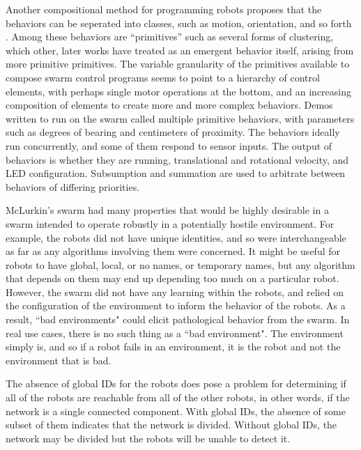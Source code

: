 \documentclass[]{article}
\begin{document}
Another compositional method for programming robots proposes that the behaviors can be seperated into classes, such as motion, orientation, and so forth \cite{mclurkin2004stupid}. 
Among these behaviors are ``primitives'' such as several forms of clustering, which other, later works have treated as an emergent behavior itself, arising from more primitive primitives. 
The variable granularity of the primitives available to compose swarm control programs seems to point to a hierarchy of control elements, with perhaps single motor operations at the bottom, and an increasing composition of elements to create more and more complex behaviors.
Demos written to run on the swarm called multiple primitive behaviors, with parameters such as degrees of bearing and centimeters of proximity. 
The behaviors ideally run concurrently, and some of them respond to sensor inputs. 
The output of behaviors is whether they are running, translational and rotational velocity, and LED configuration. 
Subsumption and summation are used to arbitrate between behaviors of differing priorities. 

McLurkin's swarm had many properties that would be highly desirable in a swarm intended to operate robustly in a potentially hostile environment. 
For example, the robots did not have unique identities, and so were interchangeable as far as any algorithms involving them were concerned. 
It might be useful for robots to have global, local, or no names, or temporary names, but any algorithm that depends on them may end up depending too much on a particular robot. 
However, the swarm did not have any learning within the robots, and relied on the configuration of the environment to inform the behavior of the robots. 
As a result, ``bad environments" could elicit pathological behavior from the swarm. 
In real use cases, there is no such thing as a ``bad environment". 
The environment simply is, and so if a robot fails in an environment, it is the robot and not the environment that is bad. 

The absence of global IDs for the robots does pose a problem for determining if all of the robots are reachable from all of the other robots, in other words, if the network is a single connected component. 
With global IDs, the absence of some subset of them indicates that the network is divided. 
Without global IDs, the network may be divided but the robots will be unable to detect it. 
\end{document}
